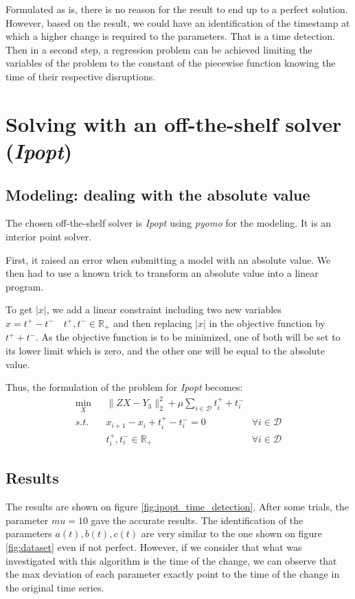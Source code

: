 \documentclass[11pt]{article}
\begin{document}
        Formulated as is, there is no reason for the result to end up to a perfect solution. However, based on the result, we could have an identification of the timestamp at which a higher change is required to the parameters. That is a time detection. Then in a second step, a regression problem can be achieved limiting the variables of the problem to the constant of the piecewise function knowing the time of their respective disruptions.

\section{Solving with an off-the-shelf solver (\emph{Ipopt})}
    \subsection{Modeling: dealing with the absolute value}
    The chosen off-the-shelf solver is \emph{Ipopt} using \emph{pyomo} for the modeling. It is an interior point solver.
    
    First, it raised an error when submitting a model with an absolute value. We then had to use a known trick to transform an absolute value into a linear program.

    To get $|x|$, we add a linear constraint including two new variables $x = t^+ - t^- \quad t^+,t^- \in \mathbb{R}_+$ and then replacing $|x|$ in the objective function by $t^+ + t^-$. As the objective function is to be minimized, one of both will be set to its lower limit which is zero, and the other one will be equal to the absolute value.
    
    Thus, the formulation of the problem for \emph{Ipopt} becomes:
    \begin{equation*}
        \begin{aligned}
            \min_{X}&{\lVert ZX - Y_3 \rVert^2_2 + \mu\sum_{i \in \mathcal{D}}{t^+_i + t^-_i}} \\
            s.t. \quad &x_{i + 1} - x_{i} + t_i^+ - t_i^- = 0 \quad &\forall i \in \mathcal{D} \\
            &t_i^+, t_i^- \in \mathbb{R}_+ &\forall i \in \mathcal{D}
        \end{aligned}
    \end{equation*}

    \subsection{Results}
    The results are shown on figure \ref{fig:ipopt_time_detection}. After some trials, the parameter $mu=10$ gave the accurate results. The identification of the parameters $a(t), b(t), c(t)$ are very similar to the one shown on figure \ref{fig:dataset} even if not perfect. However, if we consider that what was investigated with this algorithm is the time of the change, we can observe that the max deviation of each parameter exactly point to the time of the change in the original time series.
\end{document}
